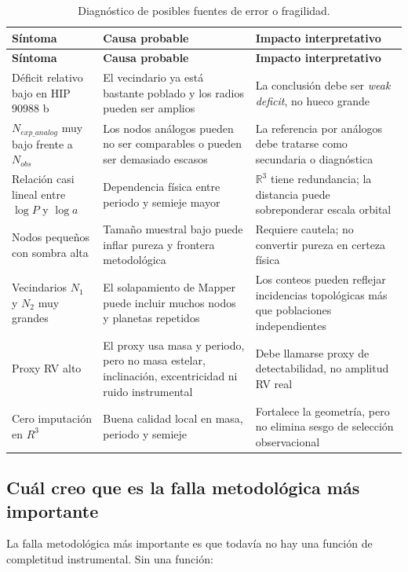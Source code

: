 \documentclass[11pt]{article}
\begin{document}
\begin{longtable}{p{}p{}p{}}
\caption{Diagnóstico de posibles fuentes de error o fragilidad.}\label{tab:error-diagnosis}\\
\toprule
\textbf{Síntoma} & \textbf{Causa probable} & \textbf{Impacto interpretativo} \\
\midrule
\endfirsthead
\toprule
\textbf{Síntoma} & \textbf{Causa probable} & \textbf{Impacto interpretativo} \\
\midrule
\endhead
Déficit relativo bajo en HIP 90988 b & El vecindario ya está bastante poblado y los radios pueden ser amplios & La conclusión debe ser \emph{weak deficit}, no hueco grande \\
\addlinespace
$N_{exp\_analog}$ muy bajo frente a $N_{obs}$ & Los nodos análogos pueden no ser comparables o pueden ser demasiado escasos & La referencia por análogos debe tratarse como secundaria o diagnóstica \\
\addlinespace
Relación casi lineal entre $\log P$ y $\log a$ & Dependencia física entre periodo y semieje mayor & $\mathbb{R}^3$ tiene redundancia; la distancia puede sobreponderar escala orbital \\
\addlinespace
Nodos pequeños con sombra alta & Tamaño muestral bajo puede inflar pureza y frontera metodológica & Requiere cautela; no convertir pureza en certeza física \\
\addlinespace
Vecindarios $N_1$ y $N_2$ muy grandes & El solapamiento de Mapper puede incluir muchos nodos y planetas repetidos & Los conteos pueden reflejar incidencias topológicas más que poblaciones independientes \\
\addlinespace
Proxy RV alto & El proxy usa masa y periodo, pero no masa estelar, inclinación, excentricidad ni ruido instrumental & Debe llamarse proxy de detectabilidad, no amplitud RV real \\
\addlinespace
Cero imputación en $R^3$ & Buena calidad local en masa, periodo y semieje & Fortalece la geometría, pero no elimina sesgo de selección observacional \\
\bottomrule
\end{longtable}

\subsection{Cuál creo que es la falla metodológica más importante}

La falla metodológica más importante es que todavía no hay una función de completitud instrumental. Sin una función:
\end{document}

